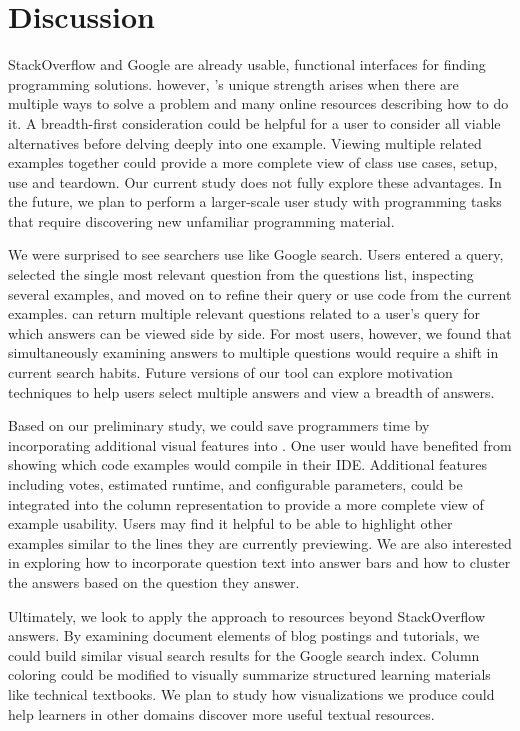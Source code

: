 \section{Discussion}

StackOverflow and Google are already usable, functional interfaces for finding programming solutions.
however, \systemname{}'s unique strength arises when there are multiple ways to solve a problem and many online resources describing how to do it.
A breadth-first consideration could be helpful for a user to consider all viable alternatives before delving deeply into one example.
Viewing multiple related examples together could provide a more complete view of class use cases, setup, use and teardown.
Our current study does not fully explore these advantages.
In the future, we plan to perform a larger-scale user study with programming tasks that require discovering new unfamiliar programming material.

We were surprised to see searchers use \systemname{} like Google search.
Users entered a query, selected the single most relevant question from the questions list, inspecting several examples, and moved on to refine their query or use code from the current examples.
\systemname{} can return multiple relevant questions related to a user's query for which answers can be viewed side by side.
For most users, however, we found that simultaneously examining answers to multiple questions would require a shift in current search habits.
Future versions of our tool can explore motivation techniques to help users select multiple answers and view a breadth of answers.

Based on our preliminary study, we could save programmers time by incorporating additional visual features into \systemname{}.
One user would have benefited from showing which code examples would compile in their IDE.
Additional features including votes, estimated runtime, and configurable parameters, could be integrated into the column representation to provide a more complete view of example usability.
Users may find it helpful to be able to highlight other examples similar to the lines they are currently previewing.
We are also interested in exploring how to incorporate question text into answer bars and how to cluster the answers based on the question they answer.

Ultimately, we look to apply the \systemname{} approach to resources beyond StackOverflow answers.
By examining document elements of blog postings and tutorials, we could build similar visual search results for the Google search index.
Column coloring could be modified to visually summarize structured learning materials like technical textbooks.
We plan to study how visualizations we produce could help learners in other domains discover more useful textual resources.

